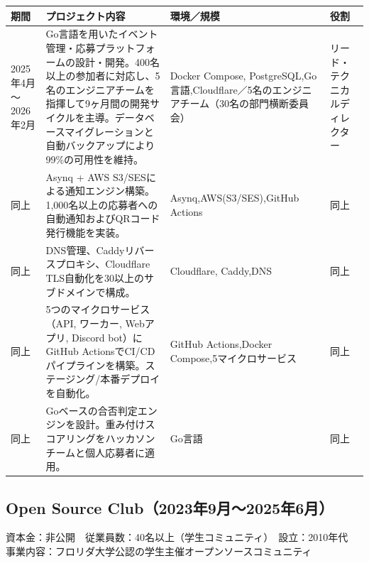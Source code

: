 \documentclass[dvipdfmx,a4paper]{jsarticle}
\begin{document}
\begin{center}
\small
\begin{tabularx}{\textwidth}{|p{2.8cm}|X|p{3.8cm}|p{3.5cm}|}
\hline
期間 & プロジェクト内容 & 環境／規模 & 役割 \\ \hline
2025年4月～\newline 2026年2月
	& Go言語を用いたイベント管理・応募プラットフォームの設計・開発。400名以上の参加者に対応し、5名のエンジニアチームを指揮して9ヶ月間の開発サイクルを主導。データベースマイグレーションと自動バックアップにより99\%の可用性を維持。
	& Docker Compose, PostgreSQL,\newline Go言語,\newline Cloudflare／\newline 5名のエンジニアチーム（30名の部門横断委員会）
	& リード・テクニカル\newline ディレクター \\ \hline
同上
	& Asynq + AWS S3/SESによる通知エンジン構築。1,000名以上の応募者への自動通知およびQRコード発行機能を実装。
	& Asynq,\newline AWS(S3/SES),\newline GitHub Actions
	& 同上 \\ \hline
同上
	& DNS管理、Caddyリバースプロキシ、Cloudflare TLS自動化を30以上のサブドメインで構成。
	& Cloudflare, Caddy,\newline DNS
	& 同上 \\ \hline
同上
	& 5つのマイクロサービス（API, ワーカー, Webアプリ, Discord bot）にGitHub ActionsでCI/CDパイプラインを構築。ステージング/本番デプロイを自動化。
	& GitHub Actions,\newline Docker Compose,\newline 5マイクロサービス
	& 同上 \\ \hline
同上
	& Goベースの合否判定エンジンを設計。重み付けスコアリングをハッカソンチームと個人応募者に適用。
	& Go言語
	& 同上 \\ \hline
\end{tabularx}
\end{center}

\subsection*{Open Source Club（2023年9月～2025年6月）}
資本金：非公開　従業員数：40名以上（学生コミュニティ）　設立：2010年代\\
事業内容：フロリダ大学公認の学生主催オープンソースコミュニティ
\end{document}
